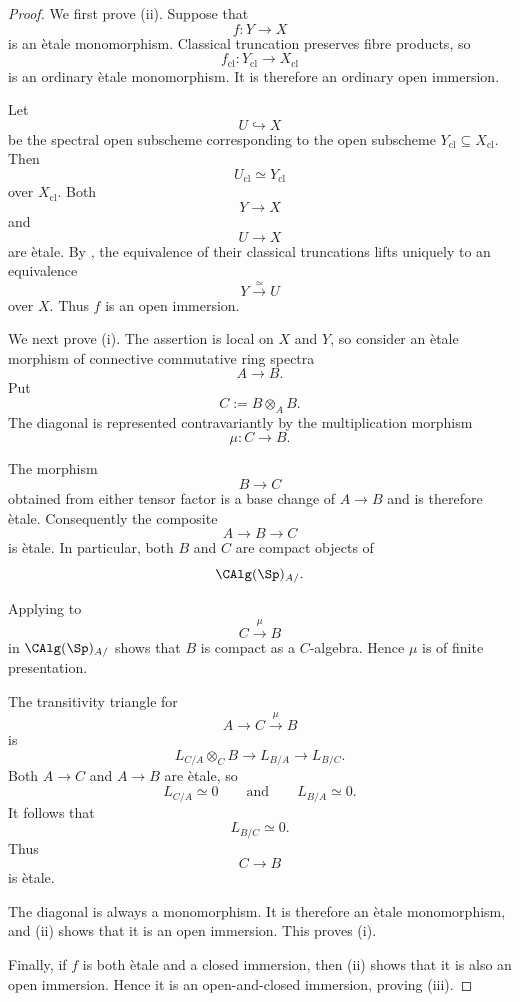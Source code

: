 \begin{proof}
We first prove (ii). Suppose that
\[
    f
    \colon
    Y
    \longrightarrow
    X
\]
is an \`etale monomorphism. Classical truncation preserves fibre
products, so
\[
    f_{\mathrm{cl}}
    \colon
    Y_{\mathrm{cl}}
    \longrightarrow
    X_{\mathrm{cl}}
\]
is an ordinary \`etale monomorphism. It is therefore an ordinary open
immersion.

Let
\[
    U
    \hookrightarrow
    X
\]
be the spectral open subscheme corresponding to the open subscheme
\(Y_{\mathrm{cl}}\subseteq X_{\mathrm{cl}}\). Then
\[
    U_{\mathrm{cl}}
    \simeq
    Y_{\mathrm{cl}}
\]
over \(X_{\mathrm{cl}}\). Both
\[
    Y
    \longrightarrow
    X
\]
and
\[
    U
    \longrightarrow
    X
\]
are \`etale. By
,
the equivalence of their classical truncations lifts uniquely to an
equivalence
\[
    Y
    \xrightarrow{\simeq}
    U
\]
over \(X\). Thus \(f\) is an open immersion.

We next prove (i). The assertion is local on \(X\) and \(Y\), so consider
an \`etale morphism of connective commutative ring spectra
\[
    A
    \longrightarrow
    B.
\]
Put
\[
    C
    :=
    B\otimes_AB.
\]
The diagonal is represented contravariantly by the multiplication
morphism
\[
    \mu
    \colon
    C
    \longrightarrow
    B.
\]

The morphism
\[
    B
    \longrightarrow
    C
\]
obtained from either tensor factor is a base change of \(A\to B\) and
is therefore \`etale. Consequently the composite
\[
    A
    \longrightarrow
    B
    \longrightarrow
    C
\]
is \`etale. In particular, both \(B\) and \(C\) are compact objects of
\[
    \CAlg(\Sp)_{A/}.
\]

Applying
to
\[
    C
    \xrightarrow{\mu}
    B
\]
in \(\CAlg(\Sp)_{A/}\) shows that \(B\) is compact as a
\(C\)-algebra. Hence \(\mu\) is of finite presentation.

The transitivity triangle for
\[
    A
    \longrightarrow
    C
    \xrightarrow{\mu}
    B
\]
is
\[
    L_{C/A}\otimes_CB
    \longrightarrow
    L_{B/A}
    \longrightarrow
    L_{B/C}.
\]
Both \(A\to C\) and \(A\to B\) are \`etale, so
\[
    L_{C/A}
    \simeq
    0
    \qquad\text{and}\qquad
    L_{B/A}
    \simeq
    0.
\]
It follows that
\[
    L_{B/C}
    \simeq
    0.
\]
Thus
\[
    C
    \longrightarrow
    B
\]
is \`etale.

The diagonal is always a monomorphism. It is therefore an \`etale
monomorphism, and (ii) shows that it is an open immersion. This proves
(i).

Finally, if \(f\) is both \`etale and a closed immersion, then (ii)
shows that it is also an open immersion. Hence it is an open-and-closed
immersion, proving (iii).
\end{proof}

